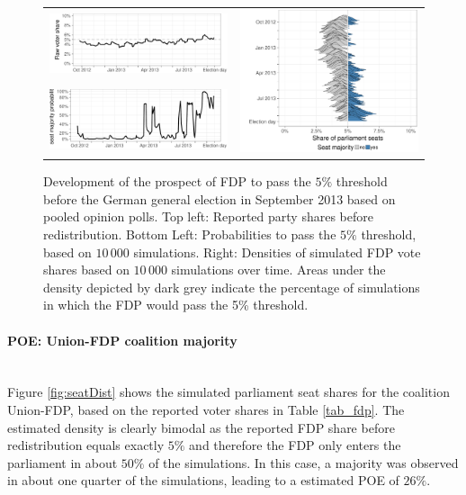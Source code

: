 \documentclass[smallcondensed]{svjour3}     %
\begin{document}
\begin{figure}[H]\centering
\begin{tabular}{ll}
\includegraphics[height=.15\textwidth]{figures/2013_pooled_fdp_rawShares.pdf}
&
\multirow{2}{*}[13ex]{\includegraphics[height=30ex]{figures/2013_pooled_fdp_ridgeline.pdf}}
\\
\includegraphics[height=.15\textwidth]{figures/2013_pooled_fdp_passingProb.pdf}
\end{tabular}
\caption{Development of the prospect of FDP to pass the $5\%$ threshold before the
German general election in September 2013 based on pooled opinion polls.
Top left: Reported party shares before redistribution. Bottom Left: Probabilities
to pass the $5\%$ threshold, based on $10\,000$ simulations. Right: Densities of
simulated FDP vote shares based on $10\,000$ simulations over time. Areas under
the density depicted by dark grey indicate the percentage of simulations in which
the FDP would pass the 5\% threshold.
\label{fig:2013_fdp}
}
\end{figure}


\paragraph{POE: Union-FDP coalition majority} \ \\

Figure \ref{fig:seatDist} shows the simulated
parliament seat shares for the coalition Union-FDP, based on the reported
voter shares in Table \ref{tab_fdp}. The estimated density is clearly bimodal
as the reported FDP share before redistribution equals exactly $5\%$ and
therefore the FDP only enters the parliament in about $50\%$ of the simulations.
In this case, a majority was observed in about one quarter of the simulations,
leading to a estimated POE of $26\%$.
\end{document}

